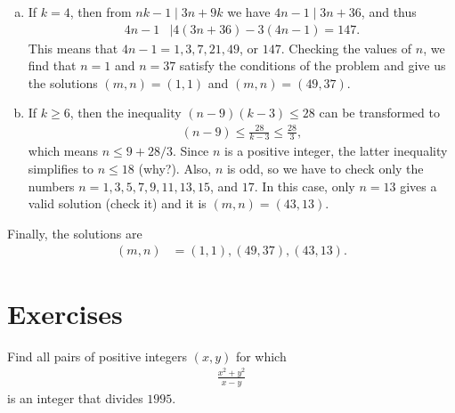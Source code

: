 \documentclass{subfile}
\begin{document}
\begin{solution}
\begin{enumerate}[(a)]
				\item If $k=4$, then from $nk-1\mid 3n+9k$ we have $4n-1\mid 3n+36$, and thus
					\begin{align*}
						4n-1
							& \mid 4(3n+36)-3(4n-1)=147.
					\end{align*}
				This means that $4n-1=1, 3, 7, 21, 49$, or $147$. Checking the values of $n$, we find that $n=1$ and $n=37$ satisfy the conditions of the problem and give us the solutions $(m,n)=(1,1)$ and $(m,n)=(49,37)$.

				\item If $k\geq 6$, then the inequality $(n-9)(k-3) \leq 28$ can be transformed to
					\begin{align*}
						(n-9) \leq \frac{28}{k-3} \leq \frac{28}{3},
					\end{align*}
				which means $n\leq 9+28/3$. Since $n$ is a positive integer, the latter inequality simplifies to $n \leq 18$ (why?). Also, $n$ is odd, so we have to check only the numbers $n=1, 3, 5, 7, 9, 11, 13, 15$, and $17$. In this case, only $n=13$ gives a valid solution (check it) and it is $(m,n)=(43,13)$.
			\end{enumerate}
		Finally, the solutions are
			\begin{align*}
				(m,n)
					& =(1,1), (49,37), (43,13).
			\end{align*}
	\end{solution}
\newpage
\section{Exercises}


	\begin{problem}
		Find all pairs of positive integers $(x, y)$ for which
			\begin{align*}
				\frac{x^2+y^2}{x-y}
			\end{align*}
		is an integer that divides $1995$.
	\end{problem}

%
\end{document}
